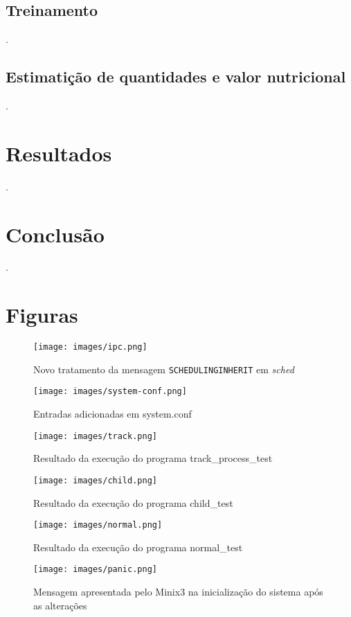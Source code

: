 \documentclass[journal]{IEEEtran}
\begin{document}
\subsection{Treinamento}
\label{sec:train}
\lipsum[1].

\subsection{Estimatição de quantidades e valor nutricional}
\label{sec:quant}
\lipsum[1].

\section{Resultados}
\label{sec:resultados}
\lipsum[1].

\section{Conclusão}
\label{sec:conclusao}
\lipsum[1].

\clearpage

\appendices
\section{Figuras}

\begin{figure}[H]
    \centering
    \texttt{[image: images/ipc.png]}
    \caption{Novo tratamento da mensagem \texttt{SCHEDULING\textunderscore INHERIT} em \textit{sched}}
    \label{fig:ipc}
\end{figure}

\begin{figure}[H]
    \centering
    \texttt{[image: images/system-conf.png]}
    \caption{Entradas adicionadas em system.conf}
    \label{fig:systemconf}
\end{figure}

\begin{figure}[H]
    \centering
    \texttt{[image: images/track.png]}
    \caption{Resultado da execução do programa track\_process\_test}
    \label{fig:track}
\end{figure}

\begin{figure}[H]
    \centering
    \texttt{[image: images/child.png]}
    \caption{Resultado da execução do programa child\_test}
    \label{fig:child}
\end{figure}

\begin{figure}[H]
    \centering
    \texttt{[image: images/normal.png]}
    \caption{Resultado da execução do programa normal\_test}
    \label{fig:normal}
\end{figure}

\begin{figure}[H]
    \centering
    \texttt{[image: images/panic.png]}
    \caption{Mensagem apresentada pelo Minix3 na inicialização do sistema após as alterações}
    \label{fig:panic}
\end{figure}

\printbibliography[title=Bibliografia]
\end{document}

